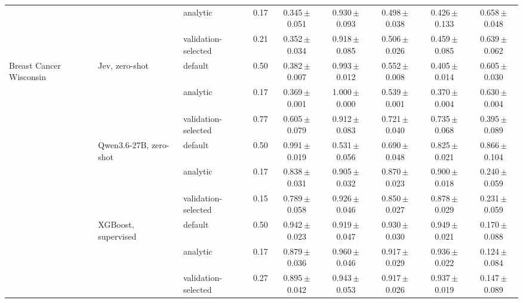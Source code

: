\begin{tabular}{lllcccccc}
 &  & analytic & 0.17 & 0.345\,{\scriptsize$\pm$0.051} & 0.930\,{\scriptsize$\pm$0.093} & 0.498\,{\scriptsize$\pm$0.038} & 0.426\,{\scriptsize$\pm$0.133} & 0.658\,{\scriptsize$\pm$0.048} \\
 &  & validation-selected & 0.21 & 0.352\,{\scriptsize$\pm$0.034} & 0.918\,{\scriptsize$\pm$0.085} & 0.506\,{\scriptsize$\pm$0.026} & 0.459\,{\scriptsize$\pm$0.085} & 0.639\,{\scriptsize$\pm$0.062} \\
\midrule
\multirow{12}{*}{Breast Cancer Wisconsin} & \multirow{3}{*}{Jev, zero-shot} & default & 0.50 & 0.382\,{\scriptsize$\pm$0.007} & 0.993\,{\scriptsize$\pm$0.012} & 0.552\,{\scriptsize$\pm$0.008} & 0.405\,{\scriptsize$\pm$0.014} & 0.605\,{\scriptsize$\pm$0.030} \\
 &  & analytic & 0.17 & 0.369\,{\scriptsize$\pm$0.001} & 1.000\,{\scriptsize$\pm$0.000} & 0.539\,{\scriptsize$\pm$0.001} & 0.370\,{\scriptsize$\pm$0.004} & 0.630\,{\scriptsize$\pm$0.004} \\
 &  & validation-selected & 0.77 & 0.605\,{\scriptsize$\pm$0.079} & 0.912\,{\scriptsize$\pm$0.083} & 0.721\,{\scriptsize$\pm$0.040} & 0.735\,{\scriptsize$\pm$0.068} & 0.395\,{\scriptsize$\pm$0.089} \\
\cmidrule(lr){2-9}
 & \multirow{3}{*}{Qwen3.6-27B, zero-shot} & default & 0.50 & 0.991\,{\scriptsize$\pm$0.019} & 0.531\,{\scriptsize$\pm$0.056} & 0.690\,{\scriptsize$\pm$0.048} & 0.825\,{\scriptsize$\pm$0.021} & 0.866\,{\scriptsize$\pm$0.104} \\
 &  & analytic & 0.17 & 0.838\,{\scriptsize$\pm$0.031} & 0.905\,{\scriptsize$\pm$0.032} & 0.870\,{\scriptsize$\pm$0.023} & 0.900\,{\scriptsize$\pm$0.018} & 0.240\,{\scriptsize$\pm$0.059} \\
 &  & validation-selected & 0.15 & 0.789\,{\scriptsize$\pm$0.058} & 0.926\,{\scriptsize$\pm$0.046} & 0.850\,{\scriptsize$\pm$0.027} & 0.878\,{\scriptsize$\pm$0.029} & 0.231\,{\scriptsize$\pm$0.059} \\
\cmidrule(lr){2-9}
 & \multirow{3}{*}{XGBoost, supervised} & default & 0.50 & 0.942\,{\scriptsize$\pm$0.023} & 0.919\,{\scriptsize$\pm$0.047} & 0.930\,{\scriptsize$\pm$0.030} & 0.949\,{\scriptsize$\pm$0.021} & 0.170\,{\scriptsize$\pm$0.088} \\
 &  & analytic & 0.17 & 0.879\,{\scriptsize$\pm$0.036} & 0.960\,{\scriptsize$\pm$0.046} & 0.917\,{\scriptsize$\pm$0.029} & 0.936\,{\scriptsize$\pm$0.022} & 0.124\,{\scriptsize$\pm$0.084} \\
 &  & validation-selected & 0.27 & 0.895\,{\scriptsize$\pm$0.042} & 0.943\,{\scriptsize$\pm$0.053} & 0.917\,{\scriptsize$\pm$0.026} & 0.937\,{\scriptsize$\pm$0.019} & 0.147\,{\scriptsize$\pm$0.089} \\

\end{tabular}
